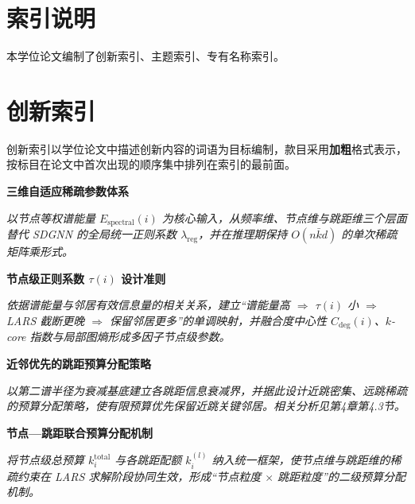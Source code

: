 
\begin{bnuindex}

    \section*{索引说明}
    
    \noindent\hspace{2em} 本学位论文编制了创新索引、主题索引、专有名称索引。
    
    \section*{创新索引}
    
    \noindent\hspace{2em} 创新索引以学位论文中描述创新内容的词语为目标编制，款目采用\textbf{加粗}格式表示，按标目在论文中首次出现的顺序集中排列在索引的最前面。
    
    \vspace{1em}
    
    \textbf{三维自适应稀疏参数体系}%
    \dotfill\pageref{idx:innov:3dim}
    
    \textit{以节点等权谱能量 $E_{\mathrm{spectral}}(i)$ 为核心输入，从频率维、节点维与跳距维三个层面替代 SDGNN 的全局统一正则系数 $\lambda_{\mathrm{reg}}$，并在推理期保持 $O(n\bar{k}d)$ 的单次稀疏矩阵乘形式。}
    
    \vspace{0.5em}
    \textbf{节点级正则系数 $\tau(i)$ 设计准则}\dotfill\pageref{idx:innov:tau}
    
    \textit{依据谱能量与邻居有效信息量的相关关系，建立“谱能量高 $\Rightarrow$ $\tau(i)$ 小 $\Rightarrow$ LARS 截断更晚 $\Rightarrow$ 保留邻居更多”的单调映射，并融合度中心性 $C_{\mathrm{deg}}(i)$、$k$\hbox{-}core 指数与局部图熵形成多因子节点级参数。}

    \vspace{0.5em}
    \textbf{近邻优先的跳距预算分配策略}\dotfill\pageref{idx:innov:hopdist}
    
    \textit{以第二谱半径为衰减基底建立各跳距信息衰减界，并据此设计近跳密集、远跳稀疏的预算分配策略，使有限预算优先保留近跳关键邻居。相关分析见第4章第4.3节。}

    \vspace{0.5em}
    \textbf{节点—跳距联合预算分配机制}\dotfill\pageref{idx:innov:joint_budget}
    
    \textit{将节点级总预算 $k_i^{\mathrm{total}}$ 与各跳距配额 $k_i^{(l)}$ 纳入统一框架，使节点维与跳距维的稀疏约束在 LARS 求解阶段协同生效，形成“节点粒度 $\times$ 跳距粒度”的二级预算分配机制。}
    

\end{bnuindex}
